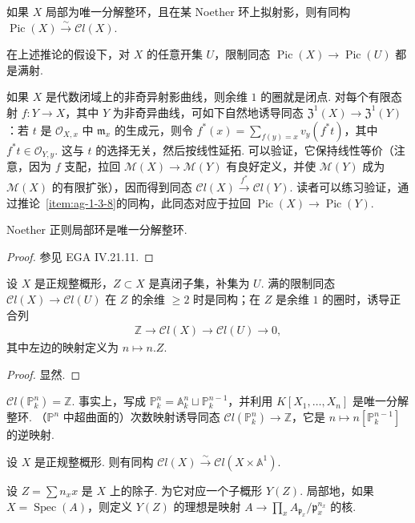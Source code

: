 \begin{corollary}\label{item:ag-1-3-8}
如果 $X$ 局部为唯一分解整环，且在某 Noether 环上拟射影，则有同构 $\operatorname{Pic}(X)\xrightarrow\sim\mathcal Cl(X)$.
\end{corollary}
\begin{remark}\label{item:ag-1-3-9}
在上述推论的假设下，对 $X$ 的任意开集 $U$，限制同态 $\operatorname{Pic}(X)\longrightarrow\operatorname{Pic}(U)$ 都是满射.
\end{remark}
\begin{example}\label{item:ag-1-3-10}
如果 $X$ 是代数闭域上的非奇异射影曲线，则余维 $1$ 的圈就是闭点. 对每个有限态射 $f:Y\longrightarrow X$，其中 $Y$ 为非奇异曲线，可如下自然地诱导同态 $\mathfrak Z^1(X)\longrightarrow\mathfrak Z^1(Y)$：若 $t$ 是 $\mathcal O_{X,x}$ 中 $\mathfrak m_x$ 的生成元，则令 $f^*(x)=\sum_{f(y)=x}v_y(f^*t)$，其中 $f^*t\in\mathcal O_{Y,y}$. 这与 $t$ 的选择无关，然后按线性延拓. 可以验证，它保持线性等价（注意，因为 $f$ 支配，拉回 $\mathcal M(X)\longrightarrow\mathcal M(Y)$ 有良好定义，并使 $\mathcal M(Y)$ 成为 $\mathcal M(X)$ 的有限扩张），因而得到同态 $\mathcal Cl(X)\xrightarrow{f^*}\mathcal Cl(Y)$. 读者可以练习验证，通过推论~\ref{item:ag-1-3-8}的同构，此同态对应于拉回 $\operatorname{Pic}(X)\longrightarrow\operatorname{Pic}(Y)$.
\end{example}
\begin{theorem}\label{item:ag-1-3-11}
Noether 正则局部环是唯一分解整环.
\end{theorem}
\begin{proof}
参见 EGA IV.21.11.
\end{proof}
\begin{proposition}\label{item:ag-1-3-12}
设 $X$ 是正规整概形，$Z\subset X$ 是真闭子集，补集为 $U$. 满的限制同态 $\mathcal Cl(X)\longrightarrow\mathcal Cl(U)$ 在 $Z$ 的余维 $\geqslant2$ 时是同构；在 $Z$ 是余维 $1$ 的圈时，诱导正合列
\begin{align*}
\mathbb Z\longrightarrow\mathcal Cl(X)\longrightarrow\mathcal Cl(U)\longrightarrow0,
\end{align*}
其中左边的映射定义为 $n\mapsto n.Z$.
\end{proposition}
\begin{proof}
显然.
\end{proof}
\begin{numpara}[应用]\label{item:ag-1-3-13}
$\mathcal Cl(\mathbb P_k^n)=\mathbb Z$. 事实上，写成 $\mathbb P_k^n=\mathbb A_k^n\sqcup\mathbb P_k^{n-1}$，并利用 $K[X_1,\ldots,X_n]$ 是唯一分解整环. （$\mathbb P^n$ 中超曲面的）次数映射诱导同态 $\mathcal Cl(\mathbb P_k^n)\longrightarrow\mathbb Z$，它是 $n\mapsto n[\mathbb P_k^{n-1}]$ 的逆映射.
\end{numpara}
\begin{proposition}\label{item:ag-1-3-14}
设 $X$ 是正规整概形. 则有同构 $\mathcal Cl(X)\xrightarrow\sim\mathcal Cl(X\times\mathbb A^1)$.
\end{proposition}
\begin{numpara}[余维 $1$ 的圈所对应的子概形]\label{item:ag-1-3-15}
设 $Z=\sum n_xx$ 是 $X$ 上的除子. 为它对应一个子概形 $Y(Z)$. 局部地，如果 $X=\operatorname{Spec}(A)$，则定义 $Y(Z)$ 的理想是映射 $A\longrightarrow\prod_xA_{\mathfrak p_x}/\mathfrak p_x^{n_x}$ 的核.
\end{numpara}
